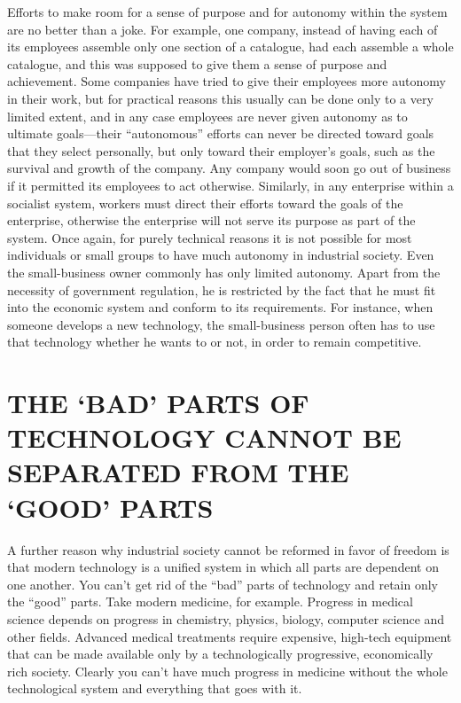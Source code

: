  Efforts to make room for a sense of purpose and for autonomy within the system are no better than a joke. For example, one company, instead of having each of its employees assemble only one section of a catalogue, had each assemble a whole catalogue, and this was supposed to give them a sense of purpose and achievement. Some companies have tried to give their employees more autonomy in their work, but for practical reasons this usually can be done only to a very limited extent, and in any case employees are never given autonomy as to ultimate goals—their “autonomous” efforts can never be directed toward goals that they select personally, but only toward their employer’s goals, such as the survival and growth of the company. Any company would soon go out of business if it permitted its employees to act otherwise. Similarly, in any enterprise within a socialist system, workers must direct their efforts toward the goals of the enterprise, otherwise the enterprise will not serve its purpose as part of the system. Once again, for purely technical reasons it is not possible for most individuals or small groups to have much autonomy in industrial society. Even the small-business owner commonly has only limited autonomy. Apart from the necessity of government regulation, he is restricted by the fact that he must fit into the economic system and conform to its requirements. For instance, when someone develops a new technology, the small-business person often has to use that technology whether he wants to or not, in order to remain competitive.

\chapter{THE ‘BAD’ PARTS OF TECHNOLOGY CANNOT BE SEPARATED FROM THE ‘GOOD’ PARTS}

 A further reason why industrial society cannot be reformed in favor of freedom is that modern technology is a unified system in which all parts are dependent on one another. You can’t get rid of the “bad” parts of technology and retain only the “good” parts. Take modern medicine, for example. Progress in medical science depends on progress in chemistry, physics, biology, computer science and other fields. Advanced medical treatments require expensive, high-tech equipment that can be made available only by a technologically progressive, economically rich society. Clearly you can’t have much progress in medicine without the whole technological system and everything that goes with it.

